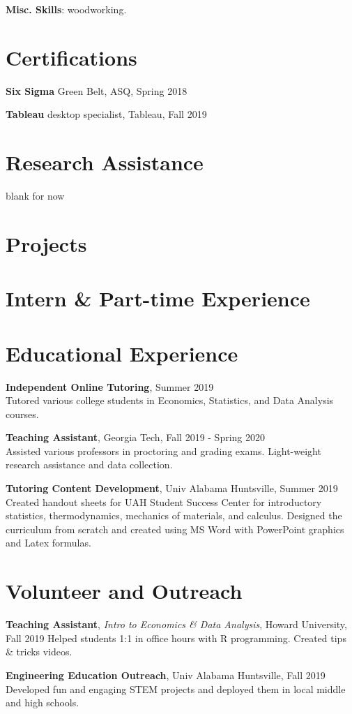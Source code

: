 \documentclass[margin,line]{res}
\begin{document}
\begin{resume}
{\bf Misc. Skills}: woodworking. 

\section{\sc Certifications}
{\bf Six Sigma} Green Belt, ASQ, Spring 2018
\vspace*{-3mm}

{\bf Tableau} desktop specialist, Tableau, Fall 2019
\vspace*{-3mm}

\section{\sc Research Assistance}
blank for now
\vspace*{1.5cm}

  

\section{\sc Projects}
\vspace*{1.5cm}

\section{\sc Intern \& Part-time Experience}
\vspace*{1.5cm}

\section{\sc Educational Experience}

    {\bf Independent Online Tutoring}, Summer 2019\\
    {Tutored various college students in Economics, Statistics, and Data Analysis courses.}

    {\bf Teaching Assistant}, Georgia Tech, Fall 2019 - Spring 2020\\
    {Assisted various professors in proctoring and grading exams. Light-weight research assistance and data collection.}
    
    {\bf Tutoring Content Development}, Univ Alabama Huntsville, Summer 2019\\
    {Created handout sheets for UAH Student Success Center for introductory statistics, thermodynamics, mechanics of materials, and calculus. Designed the curriculum from scratch and created using MS Word with PowerPoint graphics and Latex formulas.}


\section{\sc Volunteer and Outreach}

{\bf Teaching Assistant}, {\it Intro to Economics & Data Analysis}, Howard University, Fall 2019
{Helped students 1:1 in office hours with R programming. Created tips \& tricks videos.}

{\bf Engineering Education Outreach}, Univ Alabama Huntsville, Fall 2019
{Developed fun and engaging STEM projects and deployed them in local middle and high schools.}


\end{resume}
\end{document}
